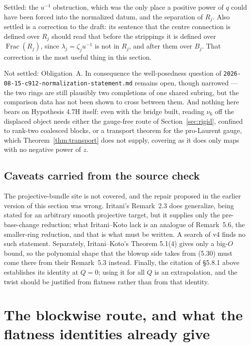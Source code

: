\documentclass[11pt]{article}
\theoremstyle{definition}
\theoremstyle{remark}
\begin{document}
Settled: the $u^{-1}$ obstruction, which was the only place a positive power of
$q$ could have been forced into the normalized datum, and the separation of
$R_j$. Also settled is a correction to the draft: its sentence that the centre
connection is defined over $R_j$ should read that before the strippings it is
defined over $\operatorname{Frac}(R_j)$, since $\lambda_j=\zeta_ju^{-1}$ is not in
$R_j$, and after them over $B_j$. That correction is the most useful thing in this
section.

Not settled: Obligation~A. In consequence the well-posedness question of
\texttt{2026-08-15-c912-normalization-statement.md} remains open, though narrowed
--- the two rings are still plausibly two completions of one shared subring, but
the comparison data has not been shown to cross between them. And nothing here
bears on Hypothesis 4.7H itself: even with the bridge built, reading $\nu_6$ off
the displaced object needs either the gauge-free route of
Section~\ref{sec:rigid}, confined to rank-two coalesced blocks, or a transport
theorem for the pro-Laurent gauge, which Theorem~\ref{thm:transport} does not
supply, covering as it does only maps with no negative power of $z$.

\subsection*{Caveats carried from the source check}

The projective-bundle site is not covered, and the repair proposed in the earlier
version of this section was wrong. Iritani's Remark~2.3 does generalize, being
stated for an arbitrary smooth projective target, but it supplies only the
pre-base-change reduction; what Iritani--Koto lack is an analogue of Remark~5.6,
the smaller-ring reduction, and that is what must be written. A search of v4
finds no such statement. Separately, Iritani--Koto's Theorem 5.1(4) gives only a
big-$O$ bound, so the polynomial shape that the blowup side takes from (5.30) must
come there from their Remark~5.3 instead. Finally, the citation of \S5.8.1 above
establishes its identity at $Q=0$; using it for all $Q$ is an extrapolation, and
the twist should be justified from flatness rather than from that identity.


\section{The blockwise route, and what the flatness identities already give}
\label{sec:blockwise}
\end{document}
